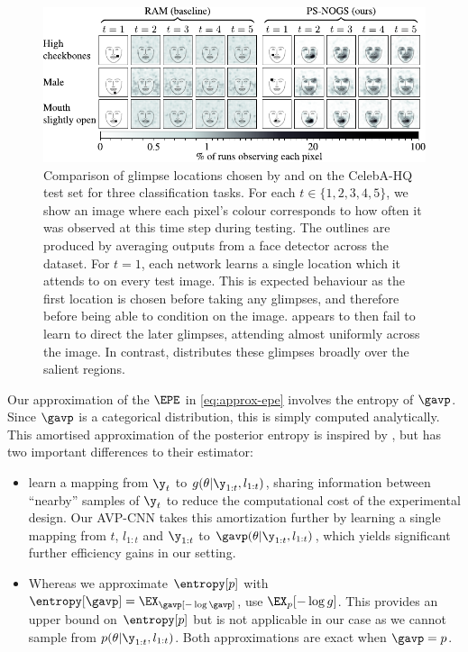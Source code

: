 \begin{figure}[t]
  \centering
  \includegraphics[scale=0.8]{figs/nogs/some-glimpses}
  \caption{Comparison of glimpse locations chosen by \RAM{} and \PSNOGS{} on the
    CelebA-HQ test set for three classification tasks. For each $t \in
    \{1,2,3,4,5\}$, we show an image where each pixel's colour corresponds to
    how often it was observed at this time step during testing. The outlines are
    produced by averaging outputs from a face detector across the dataset. For
    $t=1$, each network learns a single location which it attends to on every
    test image. This is expected behaviour as the first location is chosen
    before taking any glimpses, and therefore before being able to condition on
    the image. \RAM{} appears to then fail to learn to direct the later
    glimpses, attending almost uniformly across the image. In contrast,
    \PSNOGS{} distributes these glimpses broadly over the salient regions. }
  \label{fig:glimpses}
\end{figure}

Our approximation of the $\EPE$ in \cref{eq:approx-epe} involves the entropy of
$\gavp$. Since $\gavp$ is a categorical distribution, this is simply computed
analytically. This amortised approximation of the posterior entropy is inspired
by \cite{foster2019variational}, but has two important differences to their
estimator:
\begin{itemize}[itemsep=0pt, topsep=0pt]
\item \cite{foster2019variational} learn a mapping from $\y_t$ to
  $g(\theta | \y_{1:t}, l_{1:t})$, sharing information between ``nearby''
  samples of $\y_t$ to reduce the computational cost of the experimental design.
  Our AVP-CNN takes this amortization further by learning a single mapping from
  $t$, $l_{1:t}$ and $\y_{1:t}$ to $\gavp(\theta | \y_{1:t}, l_{1:t})$, which
  yields significant further efficiency gains in our setting.
\item Whereas we approximate $\entropy[p]$ with $\entropy[\gavp] = \EX_\gavp[-\log\gavp]$,
  \cite{foster2019variational} use $\EX_p[-\log g]$. This provides an
  upper bound on $\entropy[p]$ but is not applicable in our case as we cannot
  sample from $p(\theta|\y_{1:t}, l_{1:t})$. Both approximations are exact when
  $\gavp = p$.
\end{itemize}

